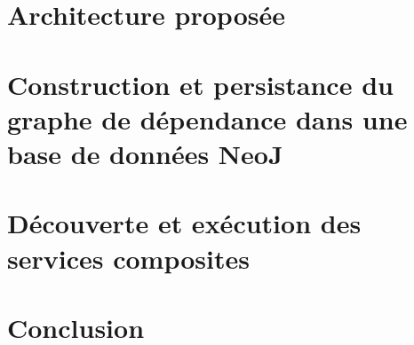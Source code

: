 \section{Architecture proposée}
\label{sec:proposition}

\section{Construction et persistance du graphe de dépendance dans une
  base de données NeoJ}
\section{Découverte et exécution des services composites}

\section*{Conclusion}
\label{sec:conclusion}
 


